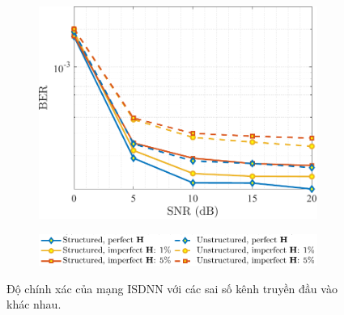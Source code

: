 \begin{figure}[H]
    \centering
    \begin{subfigure}{\linewidth}
        \centering
        \includegraphics[width=.6\linewidth]{figures/performance_2.pdf}
    \end{subfigure}
    \hfill
    \begin{subfigure}{\linewidth}
        \centering
        \includegraphics[width=.6\linewidth]{figures/lg_performance_21.pdf}
    \end{subfigure}
    \caption{Độ chính xác của mạng ISDNN với các sai số kênh truyền đầu vào khác nhau.}
    \label{fig:isdnn_1}
\end{figure}


